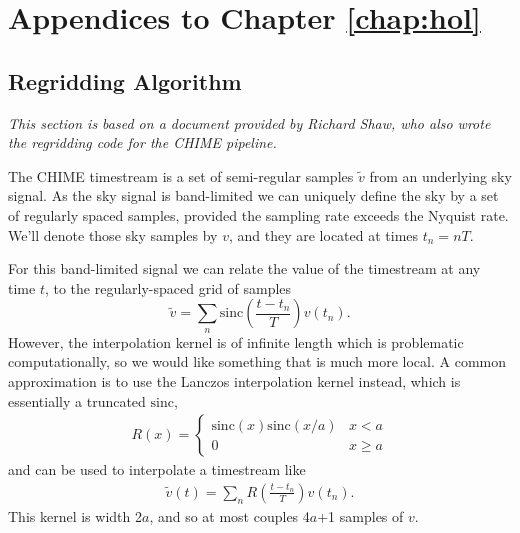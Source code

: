 \appendix

\chapter{Appendices to Chapter \ref{chap:hol}}

\section{Regridding Algorithm}
\label{app:hol:sec:regrid}

\textit{This section is based on a document provided by Richard Shaw, who also wrote the regridding code for the CHIME pipeline.}

The CHIME timestream is a set of semi-regular samples $\tilde{v}$ from an underlying sky
signal. As the sky signal is band-limited we can uniquely define the sky by a set of
regularly spaced samples, provided the sampling rate exceeds the Nyquist rate. We'll denote those sky samples by $v$, and they are located at times $t_n = n T$.

For this band-limited signal we can relate the value of the timestream at any time $t$, to the regularly-spaced grid of samples
\begin{equation}
\tilde{v} = \sum_n \mathrm{sinc}\left(\frac{t - t_n}{T}\right)v(t_n).
\end{equation}
However, the interpolation kernel is of infinite length which is problematic computationally,
so we would like something that is much more local. A common approximation
is to use the Lanczos interpolation kernel instead, which is essentially a truncated $\mathrm{sinc}$,
\begin{align}
R(x) = \begin{cases}
\mathrm{sinc}(x)\mathrm{sinc}(x/a) & x<a \\
0 & x \geq a
\end{cases}
\end{align}
and can be used to interpolate a timestream like
\begin{align}
\tilde{v}(t) = \sum_n R\left( \frac{t - t_n}{T}\right) v(t_n).
\end{align}
This kernel is width 2$a$, and so at most couples 4$a$+1 samples of $v$.

